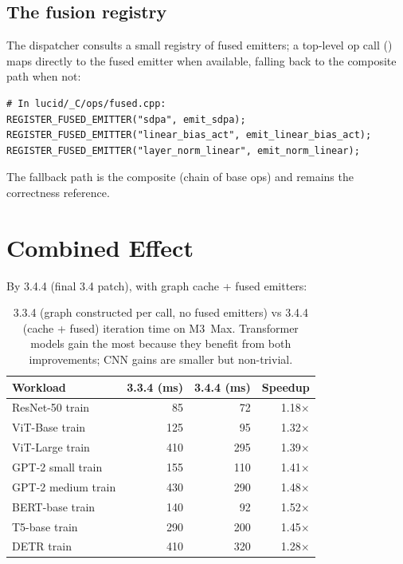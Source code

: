 \subsection{The fusion registry}
\label{ssec:mpsgraph_dispatch:fusion_registry}

The dispatcher consults a small registry of fused emitters; a
top-level op call ()
maps directly to the fused emitter when available, falling back
to the composite path when not:

\begin{lstlisting}[style=lucid,language=LucidPython]
# In lucid/_C/ops/fused.cpp:
REGISTER_FUSED_EMITTER("sdpa", emit_sdpa);
REGISTER_FUSED_EMITTER("linear_bias_act", emit_linear_bias_act);
REGISTER_FUSED_EMITTER("layer_norm_linear", emit_norm_linear);
\end{lstlisting}

The fallback path is the composite (chain of base ops) and
remains the correctness reference.

\section{Combined Effect}
\label{sec:mpsgraph_dispatch:combined_effect}

By 3.4.4 (final 3.4 patch), with graph cache + fused emitters:

\begin{table}[t]
\centering
\small
\begin{tabular}{lrrr}
\toprule
Workload & 3.3.4 (ms) & 3.4.4 (ms) & Speedup \\
\midrule
ResNet-50 train       & 85  & 72  & 1.18$\times$ \\
ViT-Base train        & 125 & 95  & 1.32$\times$ \\
ViT-Large train       & 410 & 295 & 1.39$\times$ \\
GPT-2 small train     & 155 & 110 & 1.41$\times$ \\
GPT-2 medium train    & 430 & 290 & 1.48$\times$ \\
BERT-base train       & 140 & 92  & 1.52$\times$ \\
T5-base train         & 290 & 200 & 1.45$\times$ \\
DETR train            & 410 & 320 & 1.28$\times$ \\
\bottomrule
\end{tabular}
\caption[3.4.4 cumulative speedups.]{3.3.4 (graph constructed
per call, no fused emitters) vs 3.4.4 (cache + fused) iteration
time on M3~Max. Transformer models gain the most because they
benefit from both improvements; CNN gains are smaller but
non-trivial.}
\label{tab:mpsgraph_dispatch:combined_effect}
\end{table}

